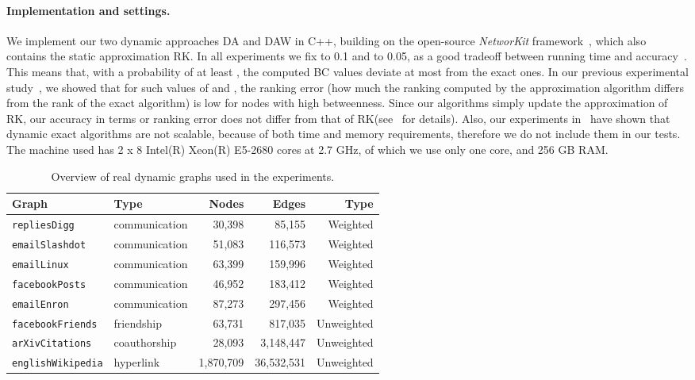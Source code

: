 \documentclass[english]{llncs}
\newcommand{\rk}{\textsf{RK}\xspace}
\begin{document}
\paragraph{Implementation and settings.} We implement our two dynamic approaches \textsf{DA} and \textsf{DAW} in C++, building on the open-source \textit{NetworKit} framework~\cite{DBLP:journals/corr/StaudtSM14}, which also contains
the static approximation \textsf{RK}.
In all experiments we fix  to 0.1 and  to 0.05, as a good tradeoff between running time and accuracy~\cite{DBLP:conf/alenex/BergaminiMS15}. 
This means that, with a probability of at least , the computed BC values deviate at most
 from the exact ones. In our previous experimental study~\cite{DBLP:conf/alenex/BergaminiMS15}, we showed that for such values of  and , the ranking error (how much the ranking computed by the approximation algorithm differs from the rank of the exact algorithm) is low for nodes with high betweenness. Since our algorithms simply update the approximation of \rk, our accuracy in terms or ranking error does not differ from that of \rk (see~\cite{DBLP:conf/alenex/BergaminiMS15} for details). Also, our experiments in~\cite{DBLP:conf/alenex/BergaminiMS15} have shown that dynamic exact algorithms are not scalable, because of both time and memory requirements, therefore we do not include them in our tests.
The machine used has 2 x 8 Intel(R) Xeon(R) E5-2680 cores at 2.7 GHz, of which we use only one core, and 256 GB RAM.
  \vspace{-2ex}
\begin{table*}[t]
\begin{center}
\begin{scriptsize}
  \begin{tabular}{ | l | l | r | r | r |}
    \hline
    Graph 						& Type 				& Nodes 			& Edges 			&  Type\\ \hline
   
    \texttt{repliesDigg}				& communication	& 30,398			& 85,155 			& Weighted	\\
    \texttt{emailSlashdot}			& communication	& 51,083 			& 116,573			& Weighted	\\ 
    \texttt{emailLinux}				& communication	& 63,399 			& 159,996			& Weighted	\\
    \texttt{facebookPosts}		& communication	& 46,952			& 183,412 		& Weighted	\\
    \texttt{emailEnron}				& communication	& 87,273 			& 297,456			& Weighted	\\
    \texttt{facebookFriends}			& friendship		& 63,731			& 817,035 		& Unweighted	\\
    \texttt{arXivCitations} 			& coauthorship 		& 28,093			& 3,148,447		& Unweighted	\\
    \texttt{englishWikipedia}		& hyperlink		& 1,870,709		& 36,532,531 		& Unweighted	\\

    \hline
  \end{tabular}
  \end{scriptsize}
\end{center}
  \caption{Overview of real dynamic graphs used in the experiments.}
  \label{table:graphs}
   \vspace{-4ex}
\end{table*}
\end{document}
